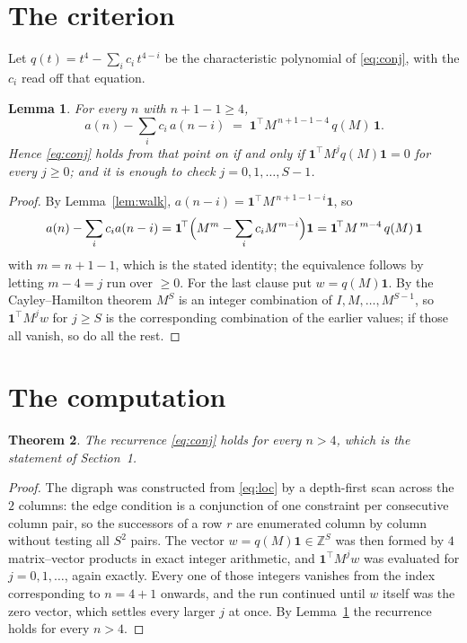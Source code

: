 \documentclass[11pt,a4paper]{article}
\theoremstyle{plain}
\newtheorem{theorem}{Theorem}
\newtheorem{lemma}[theorem]{Lemma}
\theoremstyle{definition}
\begin{document}
\section{The criterion}

Let $q(t)=t^{4}-\sum_i c_i\,t^{4-i}$ be the characteristic polynomial of
\eqref{eq:conj}, with the $c_i$ read off that equation.

\begin{lemma}\label{lem:crit}
For every $n$ with $n+1-1\ge4$,
\[
a(n)-\sum_i c_i\,a(n-i)\;=\;\mathbf{1}^{\!\top}M^{\,n+1-1-4}\,q(M)\,\mathbf{1} .
\]
Hence \eqref{eq:conj} holds from that point on if and only if
$\mathbf{1}^{\!\top}M^{j}q(M)\mathbf{1}=0$ for every $j\ge0$; and it is enough to check
$j=0,1,\dots,S-1$.
\end{lemma}

\begin{proof}
By Lemma~\ref{lem:walk}, $a(n-i)=\mathbf{1}^{\!\top}M^{\,n+1-1-i}\mathbf{1}$, so
\[
a(n)-\sum_i c_i a(n-i)
=\mathbf{1}^{\!\top}\Bigl(M^{m}-\sum_i c_i M^{m-i}\Bigr)\mathbf{1}
=\mathbf{1}^{\!\top}M^{\,m-4}\,q(M)\,\mathbf{1}
\]
with $m=n+1-1$, which is the stated identity; the equivalence follows by letting
$m-4=j$ run over $\ge0$. For the last clause put $w=q(M)\mathbf{1}$. By the
Cayley--Hamilton theorem $M^{S}$ is an integer combination of $I,M,\dots,M^{S-1}$, so
$\mathbf{1}^{\!\top}M^{j}w$ for $j\ge S$ is the corresponding combination of the earlier
values; if those all vanish, so do all the rest.
\end{proof}

\section{The computation}

\begin{theorem}
The recurrence \eqref{eq:conj} holds for every $n>4$, which is the statement of
Section~1.
\end{theorem}

\begin{proof}
The digraph was constructed from \eqref{eq:loc} by a depth-first scan across the $2$
columns: the edge condition is a conjunction of one constraint per consecutive column
pair, so the successors of a row $r$ are enumerated column by column without testing all
$S^2$ pairs. The vector $w=q(M)\mathbf{1}\in\mathbb{Z}^{S}$ was then formed by $4$
matrix--vector products in exact integer arithmetic, and $\mathbf{1}^{\!\top}M^{j}w$ was
evaluated for $j=0,1,\dots$, again exactly. Every one of those integers vanishes from the
index corresponding to $n=4+1$ onwards, and the run continued until $w$ itself was the
zero vector, which settles every larger $j$ at once. By Lemma~\ref{lem:crit} the recurrence
holds for every $n>4$.
\end{proof}
\end{document}
